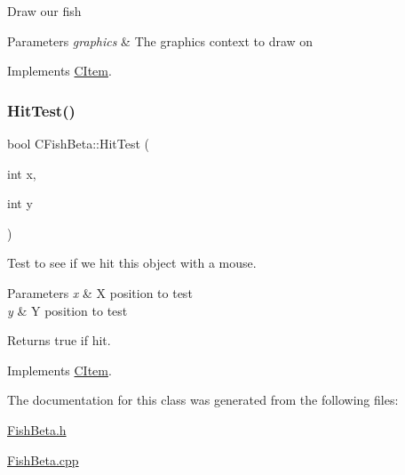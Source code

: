 Draw our fish 
\begin{DoxyParams}{Parameters}
{\em graphics} & The graphics context to draw on \\
\hline
\end{DoxyParams}


Implements \mbox{\hyperlink{class_c_item_a7ef8448d0c4bc53d0f1943a4dc817f6f}{C\+Item}}.

\mbox{\label{class_c_fish_beta_a5bdd3d07a57ca1f01a7f2c5c00e0a662}} 
\subsubsection{\texorpdfstring{HitTest()}{HitTest()}}
{\footnotesize\ttfamily bool C\+Fish\+Beta\+::\+Hit\+Test (\begin{DoxyParamCaption}\item[{int}]{x,  }\item[{int}]{y }\end{DoxyParamCaption})\hspace{0.3cm}{\ttfamily [virtual]}}

Test to see if we hit this object with a mouse. 
\begin{DoxyParams}{Parameters}
{\em x} & X position to test \\
\hline
{\em y} & Y position to test \\
\hline
\end{DoxyParams}
\begin{DoxyReturn}{Returns}
true if hit. 
\end{DoxyReturn}


Implements \mbox{\hyperlink{class_c_item_a8bd4f5e3f2eb2487125dd435719484e8}{C\+Item}}.



The documentation for this class was generated from the following files\+:\begin{DoxyCompactItemize}
\item 
\mbox{\hyperlink{_fish_beta_8h}{Fish\+Beta.\+h}}\item 
\mbox{\hyperlink{_fish_beta_8cpp}{Fish\+Beta.\+cpp}}\end{DoxyCompactItemize}
